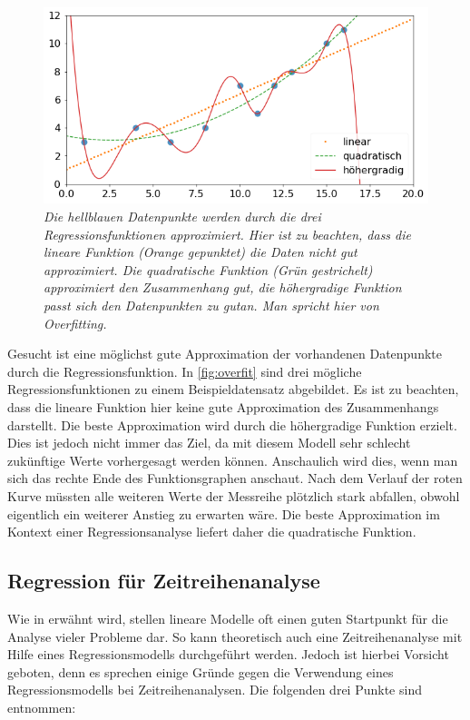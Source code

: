 \documentclass[
ngerman          %
,a4paper          %
,11pt
,pdftex
]{report}
\begin{document}
\begin{figure}
	\centering
	\includegraphics[width=0.7\linewidth]{images/overfit}
	\caption[Anpassungsgrad der Regressionsfunktion.]{\textit{Die hellblauen Datenpunkte werden durch die drei Regressionsfunktionen approximiert. Hier ist zu beachten, dass die lineare Funktion (Orange gepunktet) die Daten nicht gut approximiert. Die quadratische Funktion (Grün gestrichelt) approximiert den Zusammenhang gut, die höhergradige Funktion passt sich den Datenpunkten \glqq zu gut\grqq an. Man spricht hier von Overfitting. }}
	\label{fig:overfit}
\end{figure}


Gesucht ist eine möglichst gute Approximation der vorhandenen Datenpunkte durch die Regressionsfunktion. In \autoref{fig:overfit} sind drei mögliche Regressionsfunktionen zu einem Beispieldatensatz abgebildet. Es ist zu beachten, dass die lineare Funktion hier keine gute Approximation des Zusammenhangs darstellt. Die beste Approximation wird durch die höhergradige Funktion erzielt. Dies ist jedoch nicht immer das Ziel, da mit diesem Modell sehr schlecht zukünftige Werte vorhergesagt werden können. Anschaulich wird dies, wenn man sich das rechte Ende des Funktionsgraphen anschaut. Nach dem Verlauf der roten Kurve müssten alle weiteren Werte der Messreihe plötzlich stark abfallen, obwohl eigentlich ein weiterer Anstieg zu erwarten wäre. Die beste Approximation im Kontext einer Regressionsanalyse liefert daher die quadratische Funktion.

\subsection{Regression für Zeitreihenanalyse}
Wie in \cite[72]{mlalgos} erwähnt wird, stellen lineare Modelle oft einen guten Startpunkt für die Analyse vieler Probleme dar. So kann theoretisch auch eine Zeitreihenanalyse mit Hilfe eines Regressionsmodells durchgeführt werden. Jedoch ist hierbei Vorsicht geboten, denn es sprechen einige Gründe gegen die Verwendung eines Regressionsmodells bei Zeitreihenanalysen. Die folgenden drei Punkte sind \cite[150]{thinkstats} entnommen:
\end{document}
